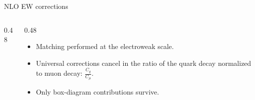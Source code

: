 \documentclass[11pt]{beamer}
\begin{document}
\begin{frame}{NLO EW corrections}
\begin{columns}[c]
\begin{column}{0.48\textwidth}
\end{column}

\begin{column}{0.48\textwidth}

\begin{itemize}
\item Matching performed at the electroweak scale.

\item Universal corrections cancel in the ratio of the quark decay normalized to muon decay: $\frac{C_q}{C_\mu}.$

\item Only box-diagram contributions survive.
\end{itemize}

\end{column}

\end{columns}
\end{frame}
\end{document}
